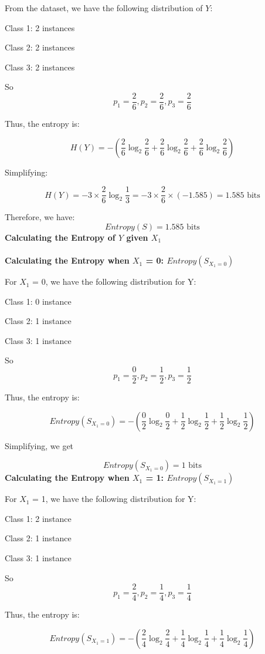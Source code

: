 \documentclass[12pt]{article}
\begin{document}
From the dataset, we have the following distribution of $Y$:

Class 1: 2 instances

Class 2: 2 instances

Class 3: 2 instances

So
\[
  p_1 = \frac{2}{6},
  p_2 = \frac{2}{6},
  p_3 = \frac{2}{6}
\]

Thus, the entropy is:

\[
  H(Y) = -\left( \frac{2}{6} \log_2 \frac{2}{6} + \frac{2}{6} \log_2 \frac{2}{6} + \frac{2}{6} \log_2 \frac{2}{6} \right)
\]

Simplifying:

\[
  H(Y) = -3 \times \frac{2}{6} \log_2 \frac{1}{3} = -3 \times \frac{2}{6} \times (-1.585) = 1.585 \text{ bits}
\]

Therefore, we have:
\[
  Entropy(S) = 1.585 \text{ bits}
\]
\newline
\textbf{Calculating the Entropy of $Y$ given $X_1$}\\\\
\textbf{Calculating the Entropy when $X_1$ = 0: $Entropy(S_{X_1=0})$}

For $X_1$ = 0, we have the following distribution for Y:

Class 1: 0 instance

Class 2: 1 instance

Class 3: 1 instance

So
\[
  p_1 = \frac{0}{2},
  p_2 = \frac{1}{2},
  p_3 = \frac{1}{2}
\]

Thus, the entropy is:

\[
  Entropy(S_{X_1=0}) = -\left( \frac{0}{2} \log_2 \frac{0}{2} + \frac{1}{2} \log_2 \frac{1}{2} + \frac{1}{2} \log_2 \frac{1}{2} \right)
\]

Simplifying, we get

\[
  Entropy(S_{X_1=0}) = 1 \text{ bits}
\]
\newline
\textbf{Calculating the Entropy when $X_1$ = 1: $Entropy(S_{X_1=1})$}

For $X_1$ = 1, we have the following distribution for Y:

Class 1: 2 instance

Class 2: 1 instance

Class 3: 1 instance

So
\[
  p_1 = \frac{2}{4},
  p_2 = \frac{1}{4},
  p_3 = \frac{1}{4}
\]

Thus, the entropy is:

\[
  Entropy(S_{X_1=1}) = -\left( \frac{2}{4} \log_2 \frac{2}{4} + \frac{1}{4} \log_2 \frac{1}{4} + \frac{1}{4} \log_2 \frac{1}{4} \right)
\]
\end{document}

